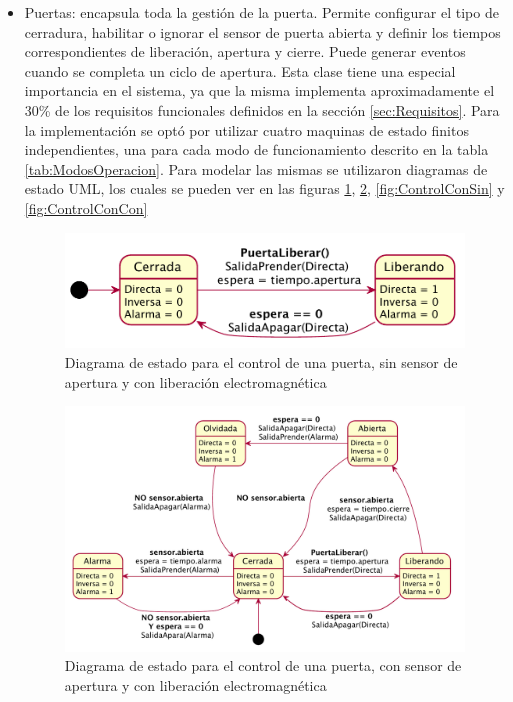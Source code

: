 \begin{itemize}
	\item Puertas: encapsula toda la gestión de la puerta. Permite configurar el tipo de cerradura, habilitar o ignorar el sensor de puerta abierta y definir los tiempos correspondientes de liberación, apertura y cierre. Puede generar eventos cuando se completa un ciclo de apertura. Esta clase tiene una especial importancia en el sistema, ya que la misma implementa aproximadamente el 30\% de los requisitos funcionales definidos en la sección \ref{sec:Requisitos}. Para la implementación se optó por utilizar cuatro maquinas de estado finitos independientes, una para cada modo de funcionamiento descrito en la tabla \ref{tab:ModosOperacion}. Para modelar las mismas se utilizaron diagramas de estado UML, los cuales se pueden ver en las figuras \ref{fig:ControlSinSin}, \ref{fig:ControlSinCon}, \ref{fig:ControlConSin} y \ref{fig:ControlConCon}

\begin{figure}[ht]
	\centering
	\includegraphics[scale=.5]{Figures/PNK-DE001.pdf}
	\caption{Diagrama de estado para el control de una puerta, sin sensor de apertura y con liberación electromagnética}
	\label{fig:ControlSinSin}
\end{figure}

\begin{figure}[ht]
	\centering
	\includegraphics[scale=.5]{Figures/PNK-DE002.pdf}
	\caption{Diagrama de estado para el control de una puerta, con sensor de apertura y con liberación electromagnética}
	\label{fig:ControlSinCon}
\end{figure}


\end{itemize}
